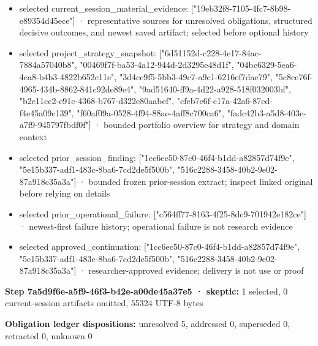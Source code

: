 \documentclass[11pt]{article}
\begin{document}
\begin{itemize}
\item selected current\_session\_material\_evidence: ["19eb32f8-7105-4fc7-8b98-e89354d45ece"] · representative sources for unresolved obligations, structured decisive outcomes, and newest saved artifact; selected before optional history
\item selected project\_strategy\_snapshot: ["6d51152d-c228-4e17-84ac-7884a57040b8", "00469f7f-ba53-4a12-944d-2d3295e48d1f", "04bc6329-5ea6-4ea8-b4b3-4822b652c11e", "3d4cc9f5-5bb3-49c7-a9c1-6216ef7dae79", "5c8ce76f-4965-434b-8862-841c92de89e4", "9ad51640-ff9a-4d22-a928-518f032003bf", "b2c11cc2-e91c-4368-b767-d322e80aabef", "cfeb7e6f-c17a-42a6-87ed-f4e45a09c139", "f60af09a-0528-4f94-88ae-4aff8c700ca6", "fadc42b3-a5d8-403c-a7f9-945797fbdf0f"] · bounded portfolio overview for strategy and domain context
\item selected prior\_session\_finding: ["1cc6ec50-87c0-46f4-b1dd-a82857d74f9e", "5e15b337-adf1-483c-8ba6-7cd2de5f500b", "516c2288-3458-40b2-9e02-87a918c35a3a"] · bounded frozen prior-session extract; inspect linked original before relying on details
\item selected prior\_operational\_failure: ["c564ff77-8163-4f25-8dc9-701942e182ce"] · newest-first failure history; operational failure is not research evidence
\item selected approved\_continuation: ["1cc6ec50-87c0-46f4-b1dd-a82857d74f9e", "5e15b337-adf1-483c-8ba6-7cd2de5f500b", "516c2288-3458-40b2-9e02-87a918c35a3a"] · researcher-approved evidence; delivery is not use or proof
\end{itemize}
\textbf{Step 7a5d9f6e-a5f9-46f3-b42e-a00de45a37e5 · skeptic:} 1 selected, 0 current-session artifacts omitted, 55324 UTF-8 bytes\par
\textbf{Obligation ledger dispositions:} unresolved 5, addressed 0, superseded 0, retracted 0, unknown 0\par
\end{document}
